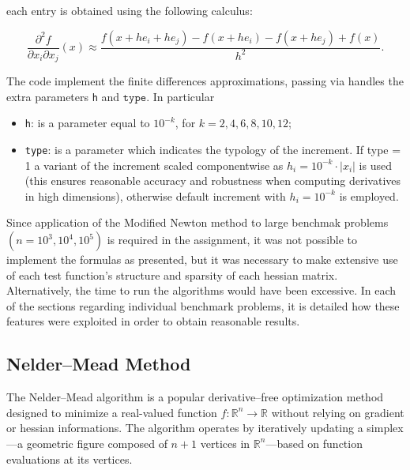 \documentclass[a4paper,12pt]{article}
\begin{document}
	
	\noindent each entry is obtained using the following calculus:
	
	\begin{equation}\label{eq3}
		\frac{\partial^{2} f}{\partial x_{i}\partial x_{j}}(x) \approx \frac{f(x+he_{i}+he_{j}) - f(x+he_{i})-f(x+he_{j})+f(x)}{h^{2}}.
	\end{equation}
	
	The code implement the finite differences approximations, passing via handles the extra parameters \texttt{h} and \( \texttt{type} \). In particular
	\begin{itemize}
		\item \texttt{h}: is a parameter equal to \(10^{-k} \), for \( k = 2, 4, 6, 8, 10, 12 \);
		\item \texttt{type}: is a parameter which indicates the typology of the increment. If type = 1 a variant of the increment scaled componentwise as \( h_i = 10^{-k} \cdot |x_i| \) is used (this ensures reasonable accuracy and robustness when computing derivatives in high dimensions), otherwise default increment with \( h_i = 10^{-k}\) is employed. 
	\end{itemize}
	
		Since application of the Modified Newton method to large benchmak problems $(n = 10^{3},10^{4},10^{5})$ is required in the assignment, it was not possible to implement the formulas as presented, but it was necessary to make extensive use of each test function's structure and sparsity of each hessian matrix. Alternatively, the time to run the algorithms would have been excessive. In each of the sections regarding individual benchmark problems, it is detailed how these features were exploited in order to obtain reasonable results. 
	
	
		
	\vspace{1em}
	
	
	\vspace{1em}	
		
	\newpage
	\subsection{Nelder--Mead Method}
	
	The Nelder--Mead algorithm is a popular derivative--free optimization method designed to minimize a real-valued function \( f: \mathbb{R}^n \to \mathbb{R} \) without relying on gradient or hessian informations. The algorithm operates by iteratively updating a simplex—a geometric figure composed of \( n+1 \) vertices in \( \mathbb{R}^n \)—based on function evaluations at its vertices.
	
\end{document}
